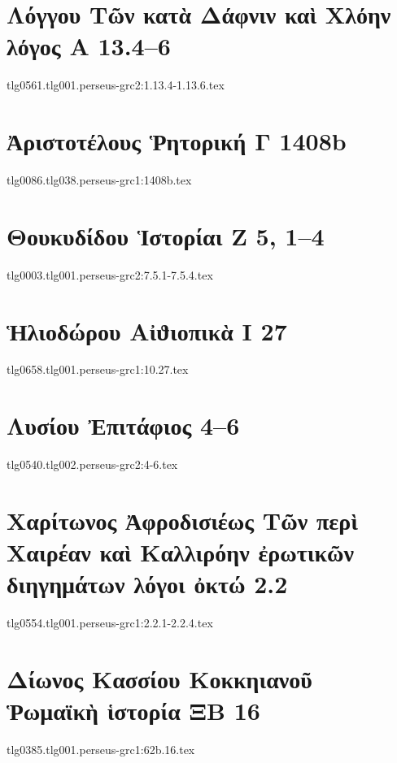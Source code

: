 \documentclass[a4paper,12pt,twoside]{report}
\begin{document}
\chapter[Λόγγου Τῶν κατὰ Δάφνιν καὶ Χλόην]{\textgreek[variant=ancient]{Λόγγου Τῶν κατὰ Δάφνιν καὶ Χλόην λόγος Α} 13.4–6}
{tlg0561.tlg001.perseus-grc2:1.13.4-1.13.6.tex}

\chapter[Ἀριστοτέλους Ῥητορική Γ]{\textgreek[variant=ancient]{Ἀριστοτέλους Ῥητορική Γ} 1408b}
{tlg0086.tlg038.perseus-grc1:1408b.tex}

\chapter[Θουκυδίδου Ἱστορίαι Ζ]{\textgreek[variant=ancient]{Θουκυδίδου Ἱστορίαι Ζ} 5, 1–4}
{tlg0003.tlg001.perseus-grc2:7.5.1-7.5.4.tex}

\chapter[Ἡλιοδώρου Αἰϑιοπικὰ Ι]{\textgreek[variant=ancient]{Ἡλιοδώρου Αἰϑιοπικὰ Ι} 27}
{tlg0658.tlg001.perseus-grc1:10.27.tex}

\chapter[Λυσίου Ἐπιτάφιος]{\textgreek[variant=ancient]{Λυσίου Ἐπιτάφιος} 4–6}
{tlg0540.tlg002.perseus-grc2:4-6.tex}

\chapter[Χαρίτωνος Τὰ περὶ Χαιρέαν καὶ Καλλιρόην]{\textgreek[variant=ancient]{Χαρίτωνος Ἀφροδισιέως Τῶν περὶ Χαιρέαν καὶ Καλλιρόην ἐρωτικῶν διηγημάτων λόγοι ὀκτώ} 2.2}
{tlg0554.tlg001.perseus-grc1:2.2.1-2.2.4.tex}

\chapter[Δίωνος Κασσίου Ῥωμαϊκὴ ἱστορία ΞΒ 16]{\textgreek[variant=ancient]{Δίωνος Κασσίου Κοκκηιανοῦ\\Ῥωμαϊκὴ ἱστορία ΞΒ} 16}
{tlg0385.tlg001.perseus-grc1:62b.16.tex}
\end{document}
